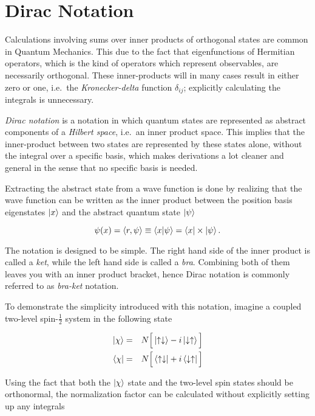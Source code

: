 \chapter{Dirac Notation}
\label{app:Dirac}

Calculations involving sums over inner products of orthogonal states are common in Quantum Mechanics. This due to the fact that eigenfunctions of Hermitian operators, which is the kind of operators which represent observables\cite{griffiths}, are necessarily orthogonal\cite{golub1996matrix}. These inner-products will in many cases result in either zero or one, i.e.~the \textit{Kronecker-delta} function $\delta_{ij}$; explicitly calculating the integrals is unnecessary. 

\textit{Dirac notation} is a notation in which quantum states are represented as abstract components of a \textit{Hilbert space}, i.e.~an inner product space. This implies that the inner-product between two states are represented by these states alone, without the integral over a specific basis, which makes derivations a lot cleaner and general in the sense that no specific basis is needed.

Extracting the abstract state from a wave function is done by realizing that the wave function can be written as the inner product between the position basis eigenstates $\left| x \right>$ and the abstract quantum state $\left| \psi \right>$ 

\begin{equation*}
 \psi(x) = \langle r, \psi \rangle \equiv \left\langle x | \psi\right\rangle = \left< x \right|\times\left| \psi \right>. 
\end{equation*}


The notation is designed to be simple. The right hand side of the inner product is called a \textit{ket}, while the left hand side is called a \textit{bra}. Combining both of them leaves you with an inner product bracket, hence Dirac notation is commonly referred to as \textit{bra-ket} notation. 

To demonstrate the simplicity introduced with this notation, imagine a coupled two-level spin-$\frac{1}{2}$ system in the following state

\begin{eqnarray}
 \left| \chi \right> &=& N\Big[\left| \uparrow\downarrow \right> -i\left| \downarrow\uparrow \right>\Big]\\
 \left< \chi \right| &=& N\Big[\left< \uparrow\downarrow \right| +i\left< \downarrow\uparrow \right|\Big]
\end{eqnarray} 

Using the fact that both the $\left| \chi \right>$ state and the two-level spin states should be orthonormal, the normalization factor can be calculated without explicitly setting up any integrals

